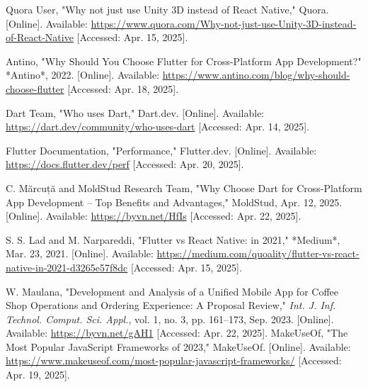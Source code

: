 \documentclass[12pt]{report}
\begin{document}
\begin{thebibliography}{1}
Quora User, "Why not just use Unity 3D instead of React Native," Quora. [Online]. Available: \url{https://www.quora.com/Why-not-just-use-Unity-3D-instead-of-React-Native} [Accessed: Apr. 15, 2025].

Antino, "Why Should You Choose Flutter for Cross-Platform App Development?" *Antino*, 2022. [Online]. Available: \url{https://www.antino.com/blog/why-should-choose-flutter} [Accessed: Apr. 18, 2025].


Dart Team, "Who uses Dart," Dart.dev. [Online]. Available: \url{https://dart.dev/community/who-uses-dart} [Accessed: Apr. 14, 2025].

Flutter Documentation, "Performance," Flutter.dev. [Online]. Available: \url{https://docs.flutter.dev/perf} [Accessed: Apr. 20, 2025].

C. Mărcuță and MoldStud Research Team, "Why Choose Dart for Cross-Platform App Development – Top Benefits and Advantages," MoldStud, Apr. 12, 2025. [Online]. Available: \url{https://byvn.net/HfIs} [Accessed: Apr. 22, 2025].

S. S. Lad and M. Narpareddi, "Flutter vs React Native: in 2021," *Medium*, Mar. 23, 2021. [Online]. Available: \url{https://medium.com/quoality/flutter-vs-react-native-in-2021-d3265e57f8dc} [Accessed: Apr. 15, 2025].

W. Maulana, "Development and Analysis of a Unified Mobile App for Coffee Shop Operations and Ordering Experience: A Proposal Review," \textit{Int. J. Inf. Technol. Comput. Sci. Appl.}, vol. 1, no. 3, pp. 161--173, Sep. 2023. [Online]. Available: \url{https://byvn.net/gAH1} [Accessed: Apr. 22, 2025].
MakeUseOf, "The Most Popular JavaScript Frameworks of 2023," MakeUseOf. [Online]. Available: \url{https://www.makeuseof.com/most-popular-javascript-frameworks/} [Accessed: Apr. 19, 2025].

\end{thebibliography}
\end{document}
